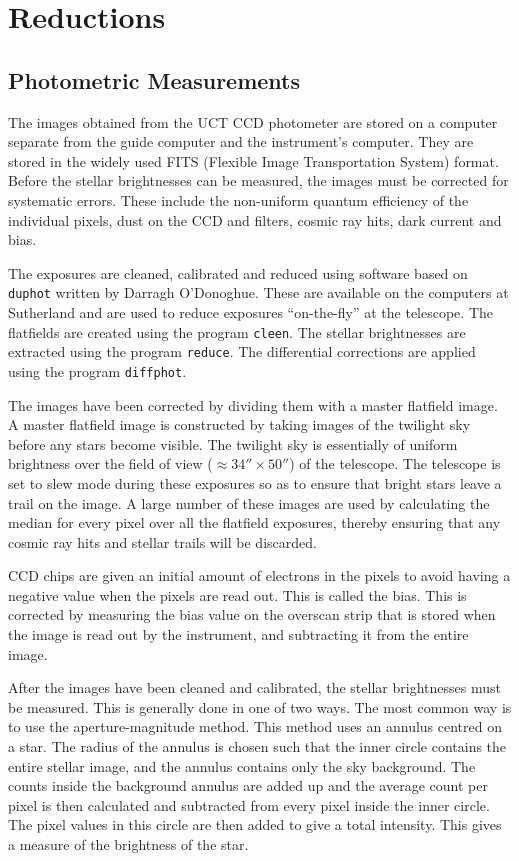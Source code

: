\section{Reductions}

\subsection{Photometric Measurements}

\label{phot_reductions}

The images obtained from the UCT CCD photometer are stored on a computer separate from the guide computer and the instrument's computer. They are stored in the widely used FITS (Flexible Image Transportation System) format. Before the stellar brightnesses can be measured, the images must be corrected for systematic errors. These include the non-uniform quantum efficiency of the individual pixels, dust on the CCD and filters, cosmic ray hits, dark current and bias.

The exposures are cleaned, calibrated and reduced using software based on \texttt{duphot} written by Darragh O'Donoghue. These are available on the computers at Sutherland and are used to reduce exposures ``on-the-fly'' at the telescope. The flatfields are created using the program \texttt{cleen}. The stellar brightnesses are extracted using the program \texttt{reduce}. The differential corrections are applied using the program \texttt{diffphot}.

The images have been corrected by dividing them with a master flatfield image. A master flatfield image is constructed by taking images of the twilight sky before any stars become visible. The twilight sky is essentially of uniform brightness over the field of view ($\approx 34''\times50''$) of the telescope. The telescope is set to slew mode during these exposures so as to ensure that bright stars leave a trail on the image. A large number of these images are used by calculating the median for every pixel over all the flatfield exposures, thereby ensuring that any cosmic ray hits and stellar trails will be discarded.

CCD chips are given an initial amount of electrons in the pixels to avoid having a negative value when the pixels are read out. This is called the bias. This is corrected by measuring the bias value on the overscan strip that is stored when the image is read out by the instrument, and subtracting it from the entire image.


After the images have been cleaned and calibrated, the stellar brightnesses must be measured. This is generally done in one of two ways. The most common way is to use the aperture-magnitude method. This method uses an annulus centred on a star. The radius of the annulus is chosen such that the inner circle contains the entire stellar image, and the annulus contains only the sky background. The counts inside the background annulus are added up and the average count per pixel is then calculated and subtracted from every pixel inside the inner circle. The pixel values in this circle are then added to give a total intensity. This gives a measure of the brightness of the star.

